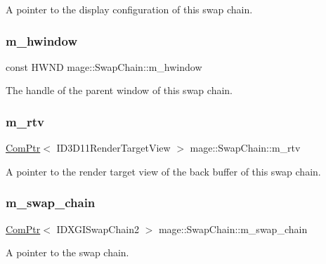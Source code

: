 A pointer to the display configuration of this swap chain. \hypertarget{classmage_1_1_swap_chain_aea5964cd3bd2bfef89ae428cceef82fd}{}\label{classmage_1_1_swap_chain_aea5964cd3bd2bfef89ae428cceef82fd} 
\subsubsection{\texorpdfstring{m\+\_\+hwindow}{m\_hwindow}}
{\footnotesize\ttfamily const H\+W\+ND mage\+::\+Swap\+Chain\+::m\+\_\+hwindow\hspace{0.3cm}{\ttfamily [private]}}

The handle of the parent window of this swap chain. \hypertarget{classmage_1_1_swap_chain_a87610dab11ac73b2e5c2510e013640ac}{}\label{classmage_1_1_swap_chain_a87610dab11ac73b2e5c2510e013640ac} 
\subsubsection{\texorpdfstring{m\+\_\+rtv}{m\_rtv}}
{\footnotesize\ttfamily \hyperlink{namespacemage_ae74f374780900893caa5555d1031fd79}{Com\+Ptr}$<$ I\+D3\+D11\+Render\+Target\+View $>$ mage\+::\+Swap\+Chain\+::m\+\_\+rtv\hspace{0.3cm}{\ttfamily [private]}}

A pointer to the render target view of the back buffer of this swap chain. \hypertarget{classmage_1_1_swap_chain_ac7ac016259f4496b56c20f7a0499968b}{}\label{classmage_1_1_swap_chain_ac7ac016259f4496b56c20f7a0499968b} 
\subsubsection{\texorpdfstring{m\+\_\+swap\+\_\+chain}{m\_swap\_chain}}
{\footnotesize\ttfamily \hyperlink{namespacemage_ae74f374780900893caa5555d1031fd79}{Com\+Ptr}$<$ I\+D\+X\+G\+I\+Swap\+Chain2 $>$ mage\+::\+Swap\+Chain\+::m\+\_\+swap\+\_\+chain\hspace{0.3cm}{\ttfamily [private]}}

A pointer to the swap chain. 